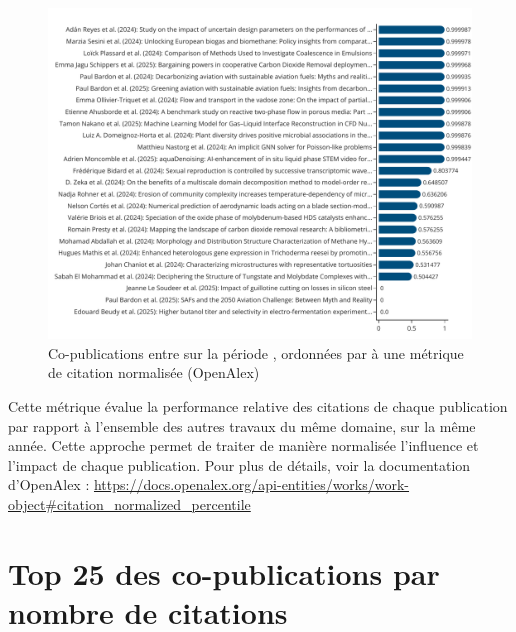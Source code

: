 \documentclass[french, 11pt]{dibiso/pubpart}
\begin{document}
\begin{figure}[!h]
  \includegraphics[width=\textwidth]{figures/works_collaborations_citationsnormalized.pdf}
  \caption{Co-publications entre {\entitiesacronym} sur la période {\reportyear}, ordonnées par à une métrique de citation normalisée (OpenAlex)}
  \label{fig_works_collaborations_citationsnormalized}
\end{figure}

{\footnotesize\workscollaborationscitationsnormalizedinfo}

Cette métrique évalue la performance relative des citations de chaque publication par rapport à l'ensemble des autres travaux du même domaine, sur la même année. Cette approche permet de traiter de manière normalisée l'influence et l'impact de chaque publication. Pour plus de détails, voir la documentation d'OpenAlex : \url{https://docs.openalex.org/api-entities/works/work-object#citation_normalized_percentile}

\bigskip








\pagebreak

\section{Top 25 des co-publications par nombre de citations}
\end{document}
